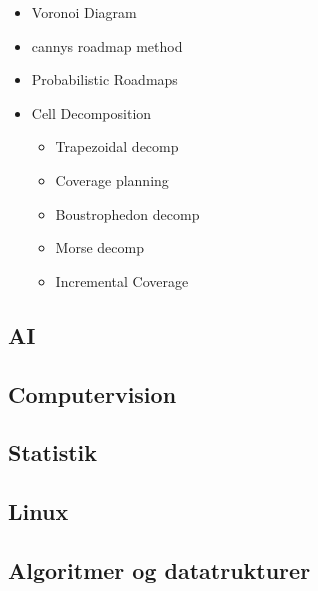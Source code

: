 \documentclass[a4paper,11pt]{article}
\begin{document}
\begin{itemize}
\begin{itemize}
            \item Voronoi Diagram
            \item cannys roadmap method
            \item Probabilistic Roadmaps
            \item Cell Decomposition
                \begin{itemize}
                    \item Trapezoidal decomp
                    \item Coverage planning
                    \item Boustrophedon decomp
                    \item Morse decomp
                    \item Incremental Coverage
                \end{itemize}
            \end{itemize}
    \end{itemize}

\subsection{AI}
\subsection{Computervision}
\subsection{Statistik}
\subsection{Linux}
\subsection{Algoritmer og datatrukturer}
\end{document}
